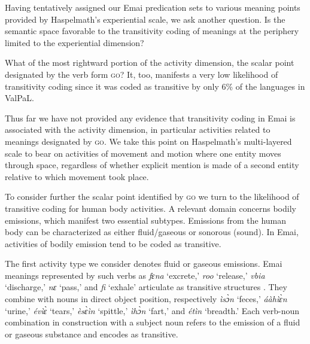 \documentclass[output=paper,colorlinks,citecolor=brown
]{langscibook}
\begin{document}
 Having tentatively assigned our Emai predication sets to various meaning points provided by Haspelmath’s experiential scale, we ask another question. Is the semantic space favorable to the transitivity coding of  meanings at the periphery limited to the experiential dimension?  

 What of the most rightward portion of the activity dimension, the scalar point designated by the verb form \textsc{go}? It, too, manifests a very low likelihood of transitivity coding since it was coded as transitive by only 6\% of the languages in ValPaL. 

Thus far we have not provided any evidence that transitivity coding in Emai is associated with the activity dimension, in particular activities related to meanings designated by \textsc{go}. We take this point on Haspelmath’s multi-layered scale to bear on activities of movement and motion where one entity moves through space, regardless of whether explicit mention is made of a second entity relative to which movement took place.  

To consider further the scalar point identified by \textsc{go} we turn to the likelihood of transitive coding for human body activities. A relevant domain concerns bodily emissions, which manifest two essential subtypes. Emissions from the human body can be characterized as either fluid/gaseous or sonorous (sound). In Emai, activities of bodily emission tend to be coded as transitive.  

The first activity type we consider denotes fluid or gaseous emissions. Emai meanings represented by such verbs as \textit{fɛna} ‘excrete,’ \textit{roo} ‘release,’ \textit{vbia} ‘discharge,’ \textit{nɛ} ‘pass,’ and \textit{fi} ‘exhale’ articulate as transitive structures . They combine with nouns in direct object position, respectively \textit{ìsɔ̀n} ‘feces,’ \textit{áàhìɛ̀n} ‘urine,’ \textit{évìɛ̀} ‘tears,’ \textit{èsɛ̀ìn} ‘spittle,’ \textit{ìhɔ̀n} ‘fart,’ and \textit{étìn} ‘breadth.’ Each verb-noun combination in construction with a subject noun refers to the emission of a fluid or gaseous substance and encodes as transitive. 
\end{document}

